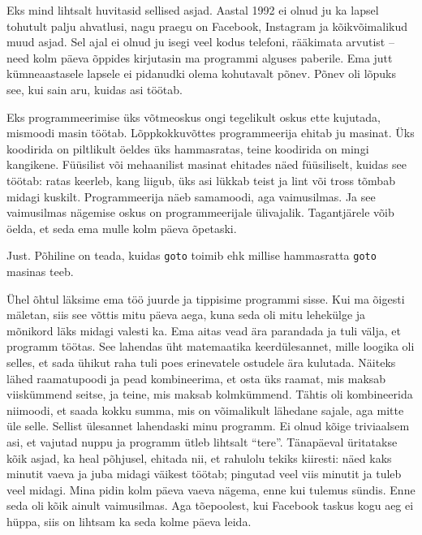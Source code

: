
Eks mind lihtsalt huvitasid sellised asjad. Aastal 1992 ei olnud ju ka lapsel 
tohutult palju ahvatlusi, nagu praegu on 
Facebook, Instagram ja kõikvõimalikud 
muud asjad. Sel ajal ei olnud ju isegi veel kodus telefoni, rääkimata arvutist 
-- need kolm päeva õppides kirjutasin ma programmi  
alguses paberile. Ema jutt kümneaastasele lapsele ei pidanudki olema
kohutavalt põnev. Põnev oli lõpuks  
see, kui sain aru, kuidas asi töötab.


Eks programmeerimise üks võtmeoskus ongi tegelikult 
oskus ette kujutada, mismoodi masin töötab. Lõppkokkuvõttes  
programmeerija ehitab ju masinat. Üks koodirida on 
piltlikult öeldes üks hammasratas, teine koodirida on mingi kangikene. 
Füüsilist või mehaanilist 
masinat ehitades näed füüsiliselt, kuidas see töötab: ratas keerleb, 
kang liigub, üks asi lükkab teist ja 
lint või tross tõmbab midagi kuskilt. 
Programmeerija näeb samamoodi, aga vaimusilmas. Ja see vaimusilmas nägemise 
oskus on 
programmeerijale ülivajalik. Tagantjärele võib öelda, et seda ema mulle 
kolm päeva õpetaski.


Just. Põhiline on teada, kuidas \verb|goto| toimib ehk 
millise hammasratta \verb|goto| masinas teeb.


Ühel õhtul läksime ema töö juurde ja  
tippisime programmi sisse. Kui ma õigesti mäletan, siis see
võttis mitu päeva aega, kuna seda oli mitu lehekülge ja mõnikord läks midagi 
valesti ka. Ema aitas vead ära parandada ja tuli välja, et programm 
töötas. See lahendas üht matemaatika keerdülesannet, mille
loogika oli selles, et sada ühikut raha tuli poes erinevatele ostudele ära 
kulutada. Näiteks lähed 
raamatupoodi ja pead 
kombineerima, et osta üks raamat, mis maksab viiskümmend seitse, ja teine, mis 
maksab kolmkümmend. Tähtis oli kombineerida niimoodi, et saada kokku summa, mis 
on võimalikult 
lähedane sajale, aga mitte üle selle. Sellist ülesannet lahendaski minu 
programm. Ei olnud kõige triviaalsem asi, et 
vajutad nuppu ja programm ütleb lihtsalt \enquote{tere}. Tänapäeval üritatakse 
kõik asjad, ka heal põhjusel, ehitada nii, et rahulolu tekiks 
kiiresti: näed kaks minutit vaeva ja 
juba midagi väikest töötab; pingutad veel viis minutit 
ja tuleb veel midagi. Mina pidin kolm päeva vaeva nägema, enne 
kui tulemus sündis. Enne seda oli kõik ainult vaimusilmas. Aga tõepoolest, kui 
Facebook taskus kogu aeg ei hüppa, siis on lihtsam ka seda kolme 
päeva leida. 

